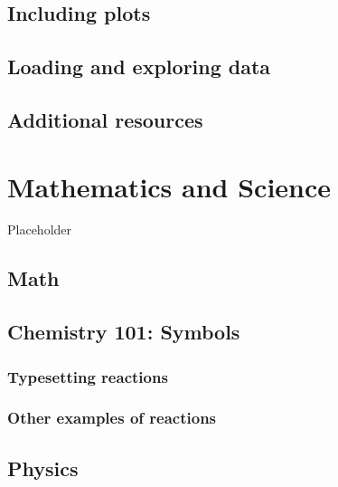 \documentclass[twoside,12pt,final]{ucthesis-CA2012}
\begin{document}
\begin{ucmainmatter}
\hypertarget{including-plots}{%
\section{Including plots}\label{including-plots}}

\hypertarget{loading-and-exploring-data}{%
\section{Loading and exploring data}\label{loading-and-exploring-data}}

\hypertarget{additional-resources}{%
\section{Additional resources}\label{additional-resources}}

\hypertarget{math-sci}{%
\chapter{Mathematics and Science}\label{math-sci}}

Placeholder

\hypertarget{math}{%
\section{Math}\label{math}}

\hypertarget{chemistry-101-symbols}{%
\section{Chemistry 101: Symbols}\label{chemistry-101-symbols}}

\hypertarget{typesetting-reactions}{%
\subsection{Typesetting reactions}\label{typesetting-reactions}}

\hypertarget{other-examples-of-reactions}{%
\subsection{Other examples of reactions}\label{other-examples-of-reactions}}

\hypertarget{physics}{%
\section{Physics}\label{physics}}


\end{ucmainmatter}
\end{document}
